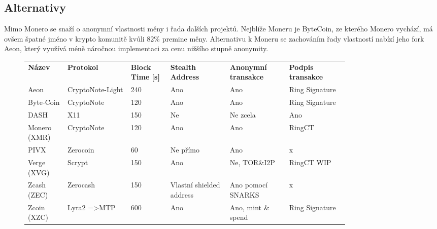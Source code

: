 \documentclass[
  printed, %
  table,   %
  nolof,     %
  nolot,     %
           oneside, color
]{fithesis3}
\begin{document}


\subsection{Alternativy}
Mimo Monero se snaží o anonymní vlastnosti měny i řada dalších projektů. Nejblíže Moneru je ByteCoin, ze kterého Monero vychází, má ovšem špatné jméno v krypto komunitě kvůli 82\% premine měny. Alternativu k Moneru se zachováním řady vlastností nabízí jeho fork Aeon, který využívá méně náročnou implementaci za cenu nižšího stupně anonymity.
\begin{figure}[H]
\centering
\begin{tabular}{p{0.1\linewidth}p{0.16\linewidth}p{0.1\linewidth}p{0.15\linewidth}p{0.15\linewidth}p{0.15\linewidth}}
\textbf{Název}        & \textbf{Protokol}                & \textbf{Block Time {[}s{]}} & \textbf{Stealth Address    }      & \textbf{Anonymní transakce} & \textbf{Podpis transakce}  \\
Aeon         & CryptoNote-Light        & 240                & Ano                      & Ano                & Ring Signature \\
Byte-Coin     & CryptoNote              & 120                & Ano                      & Ano                & Ring Signature \\
DASH         & X11                     & 150                & Ne                       & Ne zcela           & Ano            \\
Monero (XMR) & CryptoNote              & 120                & Ano                      & Ano                & RingCT         \\
PIVX         & Zerocoin                & 60                 & Ne přímo                 & Ano                & x              \\
Verge (XVG)  & Scrypt                  & 150                & Ano                      & Ne, TOR\&I2P       & RingCT WIP     \\
Zcash (ZEC)  & Zerocash                & 150                & Vlastní shielded address & Ano pomocí SNARKS    & x              \\
Zcoin (XZC)  & Lyra2 =\textgreater MTP & 600                & Ano                      & Ano, mint \& spend   & Ring Signature

\end{tabular}
\label{table:monero-alternatives}

\end{figure}
\end{document}
